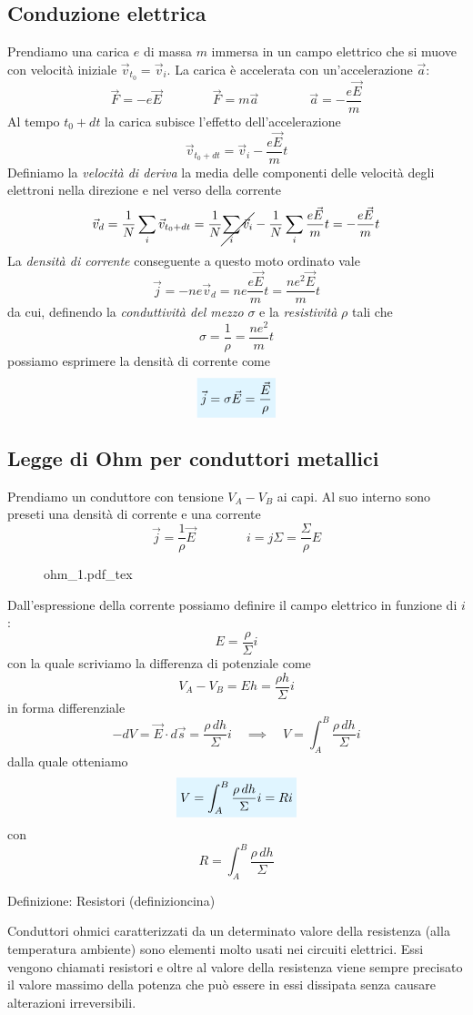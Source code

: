 \documentclass[x11names]{report}
\newcommand{\definizione}[2]{
	\begin{center}
		\fboxsep11pt
		\colorbox{myblue}{\begin{minipage}{5.75in}
				\begin{blues}{Definizione: #1}
					#2
				\end{blues}
		\end{minipage}}
	\end{center}
}
\newcommand{\incfig}[1]{%
	{#1.pdf_tex}
}
\newcommand{\viola}[1]{%
	\colorbox{myblue}{$\displaystyle #1$}
}
\begin{document}
\subsection{Conduzione elettrica}
Prendiamo una carica \(e\) di massa \(m\) immersa in un campo elettrico che si muove con velocità iniziale \(\vec{v}_{t_0} = \vec{v}_i\). La carica è accelerata con un'accelerazione \(\vec{a}\):
\[
\vec{F} = -e\vec{E} \qquad \qquad \vec{F} = m \vec{a} \qquad \qquad \vec{a} = -\frac{e\vec{E}}{m}
\]
Al tempo \(t_0 + dt\) la carica subisce l'effetto dell'accelerazione
\[
\vec{v}_{t_0+dt} = \vec{v}_i -\frac{e\vec{E}}{m}t
\]
Definiamo la \textit{velocità di deriva} la media delle componenti delle velocità degli elettroni nella direzione e nel verso della corrente
\[
	\vec{v}_d = \frac{1}{N}\sum_i \vec{v}_{t_0 + dt} = \frac{1}{N}\cancel{\sum_i \vec{v}_i} - \frac{1}{N}\sum_i\frac{e\vec{E}}{m}t 
	= -\frac{e\vec{E}}{m}t
\]
La \textit{densità di corrente} conseguente a questo moto ordinato vale
\[
\vec{j} = -ne\vec{v}_d = ne\frac{e\vec{E}}{m}t = \frac{ne^2\vec{E}}{m}t
\]
da cui, definendo la \textit{conduttività del mezzo} \(\sigma\) e la \textit{resistività} \(\rho\) tali che
\[
\sigma = \frac{1}{\rho}= \frac{ne^2}{m}t
\]
possiamo esprimere la densità di corrente come
\begin{equation}
	\viola{\vec{j} = \sigma \vec{E} = \frac{\vec{E}}{\rho}}
\end{equation}
\begin{center}
	\textcolor{red}{}
\end{center}

\subsection{Legge di Ohm per conduttori metallici}
Prendiamo un conduttore con tensione \(V_A - V_B\) ai capi. Al suo interno sono preseti una densità di corrente e una corrente
\[
\vec{j} = \frac{1}{\rho}\vec{E} \qquad \qquad i = j\Sigma = \frac{\Sigma}{\rho}E
\]
\begin{figure}[H]
	\centering
	\incfig{ohm_1}
\end{figure}
Dall'espressione della corrente possiamo definire il campo elettrico in funzione di \(i\):
\[
E = \frac{\rho}{\Sigma}i
\]
con la quale scriviamo la differenza di potenziale come
\[
V_A - V_B = Eh = \frac{\rho h}{\Sigma}i
\]
in forma differenziale
\[
-dV = \vec{E}\cdot d\vec{s} = \frac{\rho \, dh}{\Sigma}i \quad \implies \quad V = \int_A^B\frac{\rho \, dh}{\Sigma}i
\]
dalla quale otteniamo
\begin{equation}
	\viola{V = \int_A^B\frac{\rho \, dh}{\Sigma}i = Ri}
\end{equation}
con 
\[
R =  \int_A^B\frac{\rho \, dh}{\Sigma}
\]
\definizione{Resistori (definizioncina)}{
Conduttori ohmici caratterizzati da un determinato valore della resistenza (alla temperatura ambiente) sono elementi molto usati nei circuiti elettrici. Essi vengono chiamati resistori e oltre al valore della resistenza viene sempre precisato il valore massimo della potenza che può essere in essi dissipata senza causare alterazioni irreversibili.
}
\end{document}
